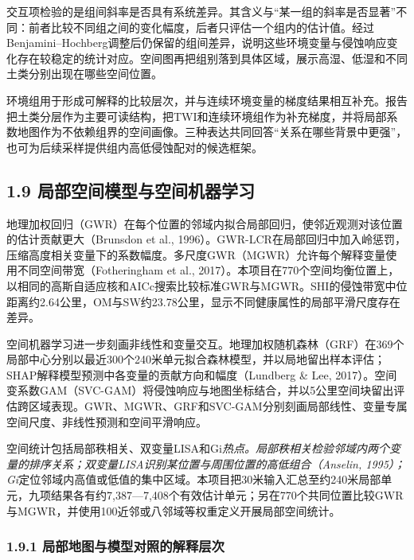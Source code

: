 \documentclass[
  11pt,
  a4paper,
]{ctexart}
\begin{document}
交互项检验的是组间斜率是否具有系统差异。其含义与``某一组的斜率是否显著''不同：前者比较不同组之间的变化幅度，后者只评估一个组内的估计值。经过Benjamini--Hochberg调整后仍保留的组间差异，说明这些环境变量与侵蚀响应变化存在较稳定的统计对应。空间图再把组别落到具体区域，展示高湿、低湿和不同土类分别出现在哪些空间位置。

环境组用于形成可解释的比较层次，并与连续环境变量的梯度结果相互补充。报告把土类分层作为主要可读结构，把TWI和连续环境组作为补充梯度，并将局部系数地图作为不依赖组界的空间画像。三种表达共同回答``关系在哪些背景中更强''，也可为后续采样提供组内高低侵蚀配对的候选框架。

\hypertarget{ux5c40ux90e8ux7a7aux95f4ux6a21ux578bux4e0eux7a7aux95f4ux673aux5668ux5b66ux4e60}{%
\subsection{1.9
局部空间模型与空间机器学习}\label{ux5c40ux90e8ux7a7aux95f4ux6a21ux578bux4e0eux7a7aux95f4ux673aux5668ux5b66ux4e60}}

地理加权回归（GWR）在每个位置的邻域内拟合局部回归，使邻近观测对该位置的估计贡献更大（Brunsdon
et al.,
1996）。GWR-LCR在局部回归中加入岭惩罚，压缩高度相关变量下的系数幅度。多尺度GWR（MGWR）允许每个解释变量使用不同空间带宽（Fotheringham
et al.,
2017）。本项目在770个空间均衡位置上，以相同的高斯自适应核和AICc搜索比较标准GWR与MGWR。SHI的侵蚀带宽中位距离约2.64公里，OM与SW约23.78公里，显示不同健康属性的局部平滑尺度存在差异。

空间机器学习进一步刻画非线性和变量交互。地理加权随机森林（GRF）在369个局部中心分别以最近300个240米单元拟合森林模型，并以局地留出样本评估；SHAP解释模型预测中各变量的贡献方向和幅度（Lundberg
\& Lee,
2017）。空间变系数GAM（SVC-GAM）将侵蚀响应与地图坐标结合，并以5公里空间块留出评估跨区域表现。GWR、MGWR、GRF和SVC-GAM分别刻画局部线性、变量专属空间尺度、非线性预测和空间平滑响应。

空间统计包括局部秩相关、双变量LISA和Gi\emph{热点。局部秩相关检验邻域内两个变量的排序关系；双变量LISA识别某位置与周围位置的高低组合（Anselin,
1995）；Gi}定位邻域内高值或低值的集中区域。本项目把30米输入汇总至约240米局部单元，九项结果各有约7,387---7,408个有效估计单元；另在770个共同位置比较GWR与MGWR，并使用100近邻或八邻域等权重定义开展局部空间统计。

\hypertarget{ux5c40ux90e8ux5730ux56feux4e0eux6a21ux578bux5bf9ux7167ux7684ux89e3ux91caux5c42ux6b21}{%
\subsubsection{1.9.1
局部地图与模型对照的解释层次}\label{ux5c40ux90e8ux5730ux56feux4e0eux6a21ux578bux5bf9ux7167ux7684ux89e3ux91caux5c42ux6b21}}
\end{document}
